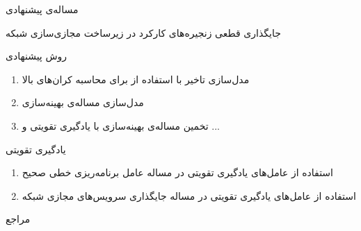\documentclass[dvipsnames]{beamer}
\makeatletter
\newcommand{\RTList}{\raggedleft\rightskip\@totalleftmargin}
\makeatother
\begin{document}
\begin{persian}
	\begin{frame}{مساله‌ی پیشنهادی}
		\begin{block}{}
			\centering
			جایگذاری قطعی زنجیره‌های کارکرد در زیرساخت مجازی‌سازی شبکه
		\end{block}
	\end{frame}

	\begin{frame}{روش‌ پیشنهادی}
		\begin{enumerate}\RTList{}
				\justifying%
				\item مدل‌سازی تاخیر با استفاده از  برای محاسبه کران‌های بالا
				\item مدل‌سازی مساله‌ی بهینه‌سازی
				\item تخمین مساله‌ی بهینه‌سازی با یادگیری تقویتی و ...
		\end{enumerate}
	\end{frame}

	\begin{frame}{یادگیری تقویتی}
		\begin{enumerate}\RTList{}
				\justifying%
				\item استفاده از عامل‌های یادگیری تقویتی در مساله عامل برنامه‌ریزی خطی صحیح
				\begin{latin}
				\scriptsize{}
				\end{latin}
				\item استفاده از عامل‌های یادگیری تقویتی در مساله جایگذاری سرویس‌های مجازی شبکه
		\end{enumerate}
	\end{frame}

	\begin{frame}[allowframebreaks]{مراجع}
		\begin{latin}
		\printbibliography[title=مراجع]
		\end{latin}
	\end{frame}

\end{persian}
\end{document}
